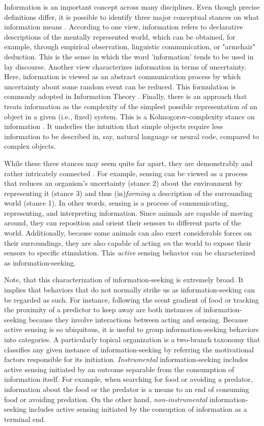 Information is an important concept across many disciplines. Even though precise definitions differ, it is possible to identify three major conceptual stances on what information means \cite{adriaans_introduction_2008}. According to one view, information refers to declarative descriptions of the mentally represented world, which can be obtained, for example, through empirical observation, linguistic communication, or "armchair" deduction. This is the sense in which the word 'information' tends to be used in lay discourse. Another view characterizes information in terms of uncertainty. Here, information is viewed as an abstract communication process by which uncertainty about some random event can be reduced. This formulation is commonly adopted in Information Theory \cite{shannon_mathematical_1948}. Finally, there is an approach that treats information as the complexity of the simplest possible representation of an object in a given (i.e., fixed) system. This is a Kolmogorov-complexity stance on information \cite{kolmogorov1965three}. It underlies the intuition that simple objects require less information to be described in, say, natural language or neural code, compared to complex objects.

While these three stances may seem quite far apart, they are demonstrably and rather intricately connected \cite{adriaans_introduction_2008}. For example, sensing can be viewed as a process that reduces an organism's uncertainty (stance 2) about the environment by representing it (stance 3) and thus (in)\emph{forming} a description of the surrounding world (stance 1). In other words, sensing is a process of communicating, representing, and interpreting information. Since animals are capable of moving around, they can reposition and orient their sensors to different parts of the world. Additionally, because some animals can also exert considerable forces on their surroundings, they are also capable of acting \emph{on} the world to expose their sensors to specific stimulation. This \emph{active} sensing behavior can be characterized as information-seeking. 

Note, that this characterization of information-seeking is extremely broad. It implies that behaviors that do not normally strike us as information-seeking can be regarded as such. For instance, following the scent gradient of food or tracking the proximity of a predictor to keep away are both instances of information-seeking because they involve interactions between acting and sensing. Because active sensing is so ubiquitous, it is useful to group information-seeking behaviors into categories. A particularly topical organization is a two-branch taxonomy that classifies any given instance of information-seeking by referring the motivational factors responsible for its initiation. \emph{Instrumental} information-seeking includes active sensing initiated by an outcome separable from the consumption of information itself. For example, when searching for food or avoiding a predator, information about the food or the predator is a means to an end of consuming food or avoiding predation. On the other hand, \emph{non-instrumental} information-seeking includes active sensing initiated by the consuption of information as a terminal end. 

